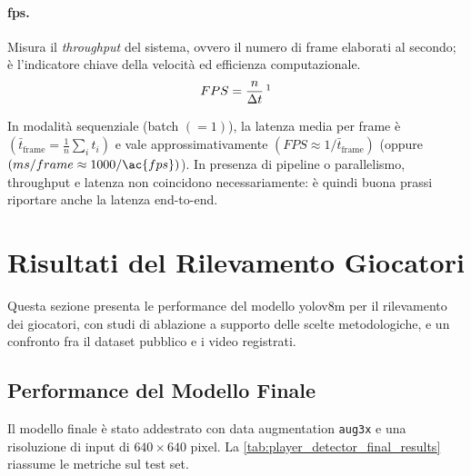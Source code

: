 \documentclass[12pt,a4paper,openright,twoside]{book}
\begin{document}
\paragraph{\acf{fps}.} Misura il \emph{throughput} del sistema, ovvero il numero di frame elaborati al secondo; 
è l'indicatore chiave della velocità ed efficienza computazionale.
\begin{equation}
  \label{eq:fps}
  {FPS} = \frac{n}{\Delta t}\,\footnotemark
\end{equation}

\noindent In modalità sequenziale (batch $(=1)$), la latenza media per frame è $(\bar{t}_{\text{frame}}=\tfrac{1}{n}\sum_i t_i)$ 
e vale approssimativamente $({FPS}\approx 1/\bar{t}_{\text{frame}})$ (oppure $({ms/frame}\approx 1000/\ac{fps})$). 
In presenza di pipeline o parallelismo, throughput e latenza non coincidono necessariamente: è quindi buona prassi 
riportare anche la latenza end-to-end.

\section{Risultati del Rilevamento Giocatori}
\label{sec:risultati-rilevamento-giocatori}
Questa sezione presenta le performance del modello \ac{yolo}v8m per il rilevamento dei giocatori, 
con studi di ablazione a supporto delle scelte metodologiche, e un confronto fra il dataset 
pubblico e i video registrati.

\subsection{Performance del Modello Finale}
Il modello finale è stato addestrato con data augmentation \texttt{aug3x} e una risoluzione di input di $640\times640$ pixel. 
La \autoref{tab:player_detector_final_results} riassume le metriche sul test set.
\end{document}

